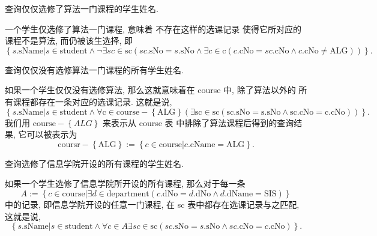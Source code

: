 \documentclass[10pt,UTF8]{book} %
\begin{document}
\begin{example}
    查询仅仅选修了算法一门课程的学生姓名.
    \begin{sol}
        一个学生仅选修了算法一门课程, 意味着 {\kaishu 不存在这样的选课记录 
        使得它所对应的课程不是算法, 而仍被该生选择},
        即
        \[ \left\{s.\mathrm{sName}
        | s \in \mathrm{student}
        \wedge \lnot \exists sc \in \mathrm{sc} \left(
            sc.\mathrm{sNo} = s.\mathrm{sNo}
            \wedge \exists c \in \mathrm{c} \left(
                c.\mathrm{cNo} = sc.\mathrm{cNo}
                \wedge c.\mathrm{cNo} \ne \mathrm{ALG}
            \right)
        \right)\right\}. \]
    \end{sol}
\end{example}

\newpage
\begin{example}
    查询仅仅没有选修算法一门课程的所有学生姓名.
    \begin{sol}
        如果一个学生仅仅没有选修算法, 那么这就意味着在 course 中, 除了算法以外的
        所有课程都存在一条对应的选课记录. 这就是说,
        \[ \left\{s.\mathrm{sName} | 
        s \in \mathrm{student 
        \wedge \forall c \in \mathrm{course}-\left\{\mathrm{ALG}\right\}\left(
            \exists sc\in\mathrm{sc} \left(
                sc.\mathrm{sNo} = s.\mathrm{sNo}
                \wedge 
                sc.\mathrm{cNo} = c.\mathrm{cNo}
            \right)
        \right)}\right\}. \]
        我们用 $\mathrm{course} - \left\{ALG\right\}$ 来表示从 course 表
        中排除了算法课程后得到的查询结果, 它可以被表示为
        \[ \mathrm{coursr}-\left\{\mathrm{ALG}\right\}
        := \left\{ c \in \mathrm{course} | c.\mathrm{cName} = \mathrm{ALG} \right\}. \]
    \end{sol}
\end{example}

\begin{example}
    查询选修了信息学院开设的所有课程的学生姓名.
    \begin{sol}
        如果一个学生选修了信息学院所开设的所有课程,
        那么对于每一条 \[ A:= \left\{c \in \mathrm{course}
        | \exists d \in \mathrm{department} \left(
            c.\mathrm{dNo} = d.\mathrm{dNo}
            \wedge d.\mathrm{dName} = \mathrm{SIS}
        \right)\right\} \]
        中的记录, 即信息学院开设的任意一门课程,
        在 sc 表中都存在选课记录与之匹配, 这就是说,
        \[ \left\{s.\mathrm{sName} | 
            s \in \mathrm{student} 
            \wedge \forall c \in A \exists sc \in \mathrm{sc} \left(
                sc.\mathrm{sNo} = s.\mathrm{sNo}
                \wedge sc.\mathrm{cNo} = c.\mathrm{cNo}
            \right)
        \right\}. \]
    \end{sol}
\end{example}
\end{document}
